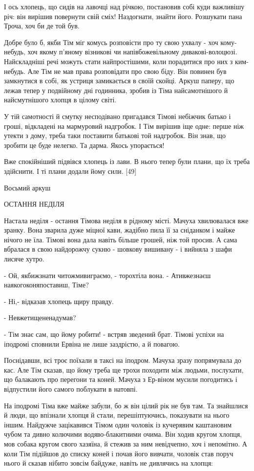 І ось хлопець, що сидів на лавочці над річкою, постановив собі куди важливішу річ: він вирішив повернути свій сміх! Наздогнати, знайти його. Розшукати пана Троча, хоч би де той був.

Добре було б, якби Тім міг комусь розповісти про ту свою ухвалу - хоч кому-небудь, хоч якому п'яному візникові чи напівбожевільному дивакові-волоцюзі. Найскладніші речі можуть стати найпростішими, коли порадитися про них з ким-небудь. Але Тім не мав права розповідати про свою біду. Він повинен був замкнутися в собі, як устриця замикається в своїй скойці. Аркуш паперу, що лежав тепер у подвійному дні годинника, зробив із Тіма найсамотнішого й найсмутнішого хлопця в цілому світі.

У тій самотності й смутку несподівано пригадався Тімові небіжчик батько і гроші, відкладені на мармуровий надгробок. І Тім вирішив іще одне: перше ніж утекти з дому, треба таки поставити батькові той надгробок. Він знав, що зробити це буде нелегко. Та дарма. Якось упорається!

Вже спокійніший підвівся хлопець із лави. В нього тепер були плани, що їх треба здійснити. І ті плани додали йому сили. [49]

Восьмий аркуш

ОСТАННЯ НЕДІЛЯ

Настала неділя - остання Тімова неділя в рідному місті. Мачуха хвилювалася вже зранку. Вона зварила дуже міцної кави, жадібно пила її за сніданком і майже нічого не їла. Тімові вона дала навіть більше грошей, ніж той просив. А сама вбралася в свою найдорожчу сукню - шовкову вишивану - і вийняла з шафи лисяче хутро.

- Ой, якбижзнати читожмивиграємо, - торохтіла вона. - Ативжезнаєш наякогоконяпоставиш, Тіме?

- Ні,- відказав хлопець щиру правду.

- Невжетищененадумав?

- Тім знає сам, що йому робити! - встряв зведений брат. Тімові успіхи на іподромі сповнили Ервіна не лише заздрістю, а й повагою.

Поснідавши, всі троє поїхали в таксі на іподром. Мачуха зразу попрямувала до кас. Але Тім сказав, що йому треба ще трохи походити між людьми, послухати, що балакають про перегони та коней. Мачуха з Ер-віном мусили погодитись і відпустили його самого поблукати в натовпі.

На іподромі Тіма вже майже забули, бо ж він цілий рік не був там. Та знайшлися й люди, що впізнали хлопця й стали, перешіптуючись, показувати на нього іншим. Найдужче зацікавився Тімом один чоловік із кучерявим каштановим чубом та дивно колючими водяво-блакитними очима. Він ходив кругом хлопця, мов собака кругом свого хазяїна, й стежив за ним невідчепно, хоч і непомітно. А коли Тім підійшов до списку коней і почав його вивчати, чоловік став поруч нього й сказав нібито зовсім байдуже, навіть не дивлячись на хлопця:

